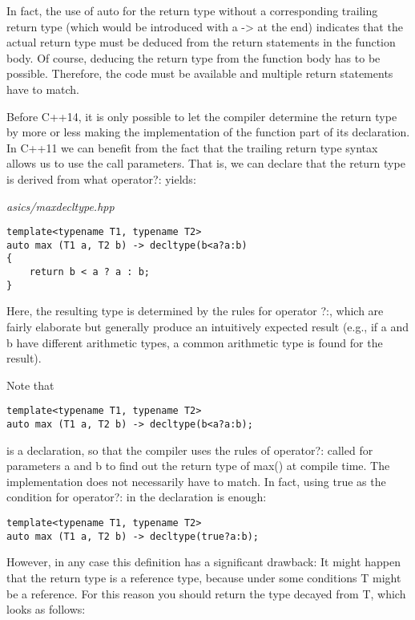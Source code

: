 In fact, the use of auto for the return type without a corresponding trailing return type (which would be introduced with a -> at the end) indicates that the actual return type must be deduced from the return statements in the function body. Of course, deducing the return type from the function body has to be possible. Therefore, the code must be available and multiple return statements have to match.

Before C++14, it is only possible to let the compiler determine the return type by more or less making the implementation of the function part of its declaration. In C++11 we can benefit from the fact that the trailing return type syntax allows us to use the call parameters. That is, we can declare that the return type is derived from what operator?: yields:

\noindent
\textit{asics/maxdecltype.hpp}
\begin{lstlisting}[style=styleCXX]
template<typename T1, typename T2>
auto max (T1 a, T2 b) -> decltype(b<a?a:b)
{
	return b < a ? a : b;
}
\end{lstlisting}

Here, the resulting type is determined by the rules for operator ?:, which are fairly elaborate but generally produce an intuitively expected result (e.g., if a and b have different arithmetic types, a common arithmetic type is found for the result).

Note that

\begin{lstlisting}[style=styleCXX]
template<typename T1, typename T2>
auto max (T1 a, T2 b) -> decltype(b<a?a:b);
\end{lstlisting}

is a declaration, so that the compiler uses the rules of operator?: called for parameters a and b to find out the return type of max() at compile time. The implementation does not necessarily have to match. In fact, using true as the condition for operator?: in the declaration is enough:

\begin{lstlisting}[style=styleCXX]
template<typename T1, typename T2>
auto max (T1 a, T2 b) -> decltype(true?a:b);
\end{lstlisting}

However, in any case this definition has a significant drawback: It might happen that the return type is a reference type, because under some conditions T might be a reference. For this reason you should return the type decayed from T, which looks as follows:

